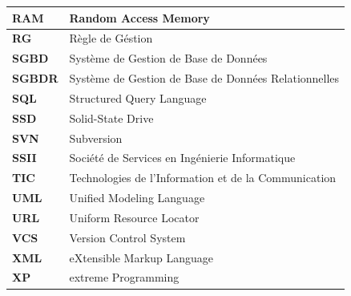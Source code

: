\documentclass[12pt]{report}
\begin{document}
\begin{longtable}{|p{4cm}|p{10cm}|}
				\textbf{RAM} & Random Access Memory\\
			\hline
				\textbf{RG} & Règle de Géstion\\
			\hline
				\textbf{SGBD} & Système de Gestion de Base de Données\\
			\hline
				\textbf{SGBDR} & Système de Gestion de Base de Données Relationnelles\\
			\hline
				\textbf{SQL} & Structured Query Language\\
			\hline
				\textbf{SSD} & Solid-State Drive\\
			\hline
				\textbf{SVN} & Subversion\\
			\hline
				\textbf{SSII} & Société de Services en Ingénierie Informatique\\
			\hline
				\textbf{TIC} & Technologies de l’Information et de la Communication\\
			\hline
				\textbf{UML} & Unified Modeling Language\\
			\hline
				\textbf{URL} & Uniform Resource Locator\\
			\hline
				\textbf{VCS} & Version Control System\\
			\hline
				\textbf{XML} & eXtensible Markup Language\\
			\hline
				\textbf{XP} & extreme Programming\\
			\hline
			\end{longtable}

			\newpage
			\setcounter{page}{1}
\end{document}
